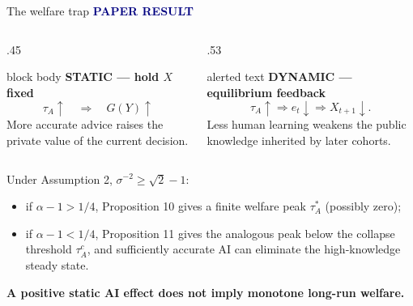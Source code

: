 \documentclass[aspectratio=169,10pt]{beamer}
\newcommand{\paperlabel}{\textcolor{Navy}{\scriptsize\bfseries PAPER RESULT}}
\begin{document}
\begin{frame}{The welfare trap}
  \paperlabel
  \vspace{.12cm}
  \begin{columns}[T,onlytextwidth]
    \begin{column}{.45\textwidth}
      \begin{beamercolorbox}[rounded=true,sep=.7em]{block body}
      \textbf{STATIC --- hold $X$ fixed}
      \[
        \tau_A\uparrow\quad\Rightarrow\quad G(Y)\uparrow
      \]
      More accurate advice raises the private value of the current decision.
      \end{beamercolorbox}
    \end{column}
    \begin{column}{.53\textwidth}
      \begin{beamercolorbox}[rounded=true,sep=.7em]{alerted text}
      \textbf{DYNAMIC --- equilibrium feedback}
      \[
        \tau_A\uparrow\Rightarrow e_t\downarrow
        \Rightarrow X_{t+1}\downarrow.
      \]
      Less human learning weakens the public knowledge inherited by later cohorts.
      \end{beamercolorbox}
    \end{column}
  \end{columns}

  \vspace{.35cm}
  \small Under Assumption 2, $\sigma^{-2}\ge\sqrt2-1$:
  \begin{itemize}\small
    \item if $\alpha-1>1/4$, Proposition 10 gives a finite welfare peak
      $\tau_A^*$ (possibly zero);
    \item if $\alpha-1<1/4$, Proposition 11 gives the analogous peak below the
      collapse threshold $\tau_A^c$, and sufficiently accurate AI can eliminate
      the high-knowledge steady state.
  \end{itemize}
  \centering\textbf{A positive static AI effect does not imply monotone long-run welfare.}
\end{frame}
\end{document}
